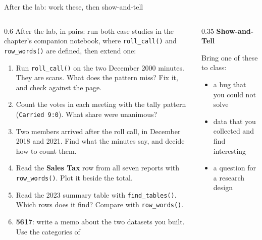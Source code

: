 \documentclass[9pt,aspectratio=169]{beamer}
\begin{document}
\begin{frame}{After the lab: work these, then show-and-tell}
    \begin{columns}[T]
        \begin{column}{0.6\textwidth}
            After the lab, in pairs: run both case studies in the chapter's companion notebook, where \texttt{roll\_call()} and \texttt{row\_words()} are defined, then extend one:
            \begin{enumerate}\small
                \item Run \texttt{roll\_call()} on the two December 2000 minutes. They are scans. What does the pattern miss? Fix it, and check against the page.
                \item Count the votes in each meeting with the tally pattern (\texttt{Carried 9:0}). What share were unanimous?
                \item Two members arrived after the roll call, in December 2018 and 2021. Find what the minutes say, and decide how to count them.
                \item Read the \textbf{Sales Tax} row from all seven reports with \texttt{row\_words()}. Plot it beside the total.
                \item Read the 2023 summary table with \texttt{find\_tables()}. Which rows does it find? Compare with \texttt{row\_words()}.
                \item[6.] \textbf{5617}: write a memo about the two datasets you built. Use the categories of \textcite{gebru2021datasheets}
            \end{enumerate}
        \end{column}
        \begin{column}{0.35\textwidth}
            \textbf{Show-and-Tell}\\[2pt]
            {\footnotesize Bring one of these to class:\par}
            \begin{itemize}\footnotesize
                \item a bug that you could not solve
                \item data that you collected and find interesting
                \item a question for a research design
            \end{itemize}
        \end{column}
    \end{columns}
\end{frame}
\end{document}
